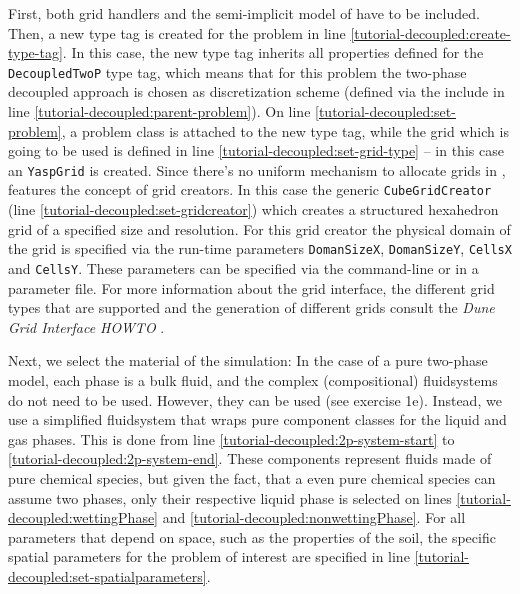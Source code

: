 First, both \Dune  grid handlers and the semi-implicit model of \eWoms 
have to be included. Then, a new type tag is created for the problem 
in line \ref{tutorial-decoupled:create-type-tag}.  In this case, the 
new type tag inherits all properties defined for the \texttt{DecoupledTwoP} 
type tag, which means that for this problem the two-phase decoupled approach
is chosen as discretization scheme (defined via the include in line 
\ref{tutorial-decoupled:parent-problem}). On line \ref{tutorial-decoupled:set-problem}, 
a problem class is attached to the new type tag, while the grid which
is going to be used is defined in line \ref{tutorial-decoupled:set-grid-type} --
in this case an \texttt{YaspGrid} is created. Since there's no uniform mechanism to
allocate grids in \Dune, \eWoms features the concept of grid creators.
In this case the generic \texttt{CubeGridCreator} (line \ref{tutorial-decoupled:set-gridcreator}) which creates a
structured hexahedron grid of a specified size and resolution. For
this grid creator the  physical domain of the grid is specified via the
run-time parameters \texttt{DomanSizeX},
\texttt{DomanSizeY}, \texttt{CellsX} and
\texttt{CellsY}. These parameters can be specified via
the command-line or in a parameter file.
For more information about the \Dune grid interface, the different grid types 
that are supported and the generation of different grids consult 
the \textit{Dune Grid Interface HOWTO} \cite{DUNE-HP}. 

Next, we select the material of the simulation: In the case of a pure two-phase
model, each phase is a bulk fluid, and the complex (compositional) fluidsystems
do not need to be used. However, they can be used (see exercise 1e). 
Instead, we use a simplified fluidsystem that wraps pure component classes 
for the liquid and gas phases. This is done from line \ref{tutorial-decoupled:2p-system-start} to 
\ref{tutorial-decoupled:2p-system-end}. These components represent fluids made of pure 
chemical species, but given the fact, that a even pure chemical species can assume two phases, only their respective liquid phase is selected on lines \ref{tutorial-decoupled:wettingPhase} and 
\ref{tutorial-decoupled:nonwettingPhase}. For all parameters that depend 
on space, such as the properties of the soil, the specific spatial parameters 
for the problem of interest are specified in line
\ref{tutorial-decoupled:set-spatialparameters}. 

